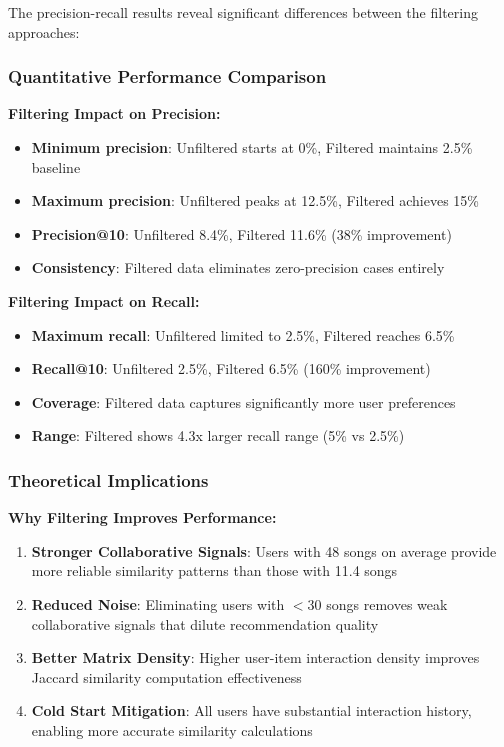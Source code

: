 \documentclass[12pt,a4paper]{article}
\begin{document}
The precision-recall results reveal significant differences between the filtering approaches:

\subsubsection{Quantitative Performance Comparison}

\textbf{Filtering Impact on Precision:}
\begin{itemize}
    \item \textbf{Minimum precision}: Unfiltered starts at 0\%, Filtered maintains 2.5\% baseline
    \item \textbf{Maximum precision}: Unfiltered peaks at 12.5\%, Filtered achieves 15\%
    \item \textbf{Precision@10}: Unfiltered 8.4\%, Filtered 11.6\% (38\% improvement)
    \item \textbf{Consistency}: Filtered data eliminates zero-precision cases entirely
\end{itemize}

\textbf{Filtering Impact on Recall:}
\begin{itemize}
    \item \textbf{Maximum recall}: Unfiltered limited to 2.5\%, Filtered reaches 6.5\%
    \item \textbf{Recall@10}: Unfiltered 2.5\%, Filtered 6.5\% (160\% improvement)
    \item \textbf{Coverage}: Filtered data captures significantly more user preferences
    \item \textbf{Range}: Filtered shows 4.3x larger recall range (5\% vs 2.5\%)
\end{itemize}

\subsubsection{Theoretical Implications}

\textbf{Why Filtering Improves Performance:}
\begin{enumerate}
    \item \textbf{Stronger Collaborative Signals}: Users with 48 songs on average provide more reliable similarity patterns than those with 11.4 songs
    \item \textbf{Reduced Noise}: Eliminating users with $<$30 songs removes weak collaborative signals that dilute recommendation quality
    \item \textbf{Better Matrix Density}: Higher user-item interaction density improves Jaccard similarity computation effectiveness
    \item \textbf{Cold Start Mitigation}: All users have substantial interaction history, enabling more accurate similarity calculations
\end{enumerate}
\end{document}
